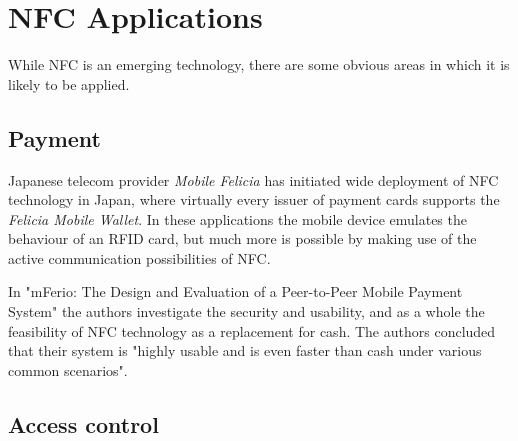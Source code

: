 \chapter{NFC Applications}
\label{chap:applications}

While NFC is an emerging technology, there are some obvious areas in which it is likely to be applied.

\section{Payment}
Japanese telecom provider \textit{Mobile Felicia} has initiated wide deployment of NFC technology in Japan, where virtually every issuer of payment cards supports the \textit{Felicia Mobile Wallet}.
In these applications the mobile device emulates the behaviour of an RFID card, but much more is possible by making use of the active communication possibilities of NFC. %

In "mFerio: The Design and Evaluation of a Peer-to-Peer Mobile Payment System" the authors investigate the security and usability, and as a whole the feasibility of NFC technology as a replacement for cash.
The authors concluded that their system is "highly usable and is even faster than cash under various common scenarios".


\section{Access control}

